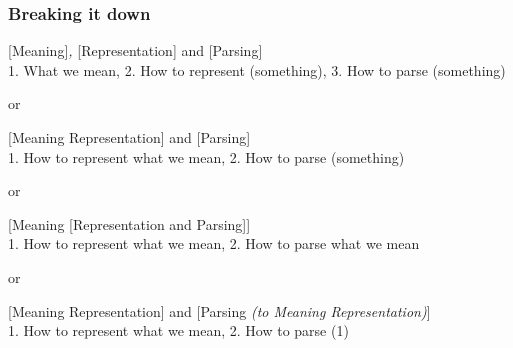 \documentclass[t,xcolor={svgnames,table}]{beamer}
\begin{document}
\begin{frame}
\frametitle{Breaking it down}
\small
\textrm{[Meaning]\textit{,} [Representation] and [Parsing]} \\
1. What we mean, 2. How to represent (something), 3. How to parse (something)

\pause
\vfill
or
\vfill

\textrm{[Meaning Representation] and [Parsing]} \\
1. How to represent what we mean, 2. How to parse (something)

\pause
\vfill
or 
\vfill

\textrm{[Meaning [Representation and Parsing]]} \\
1. How to represent what we mean, 2. How to parse what we mean

\pause
\vfill
or 
\vfill

\textrm{[Meaning Representation] and [Parsing \textit{(to Meaning Representation)}]} \\
1. How to represent what we mean, 2. How to parse (1)
\end{frame}
\end{document}
